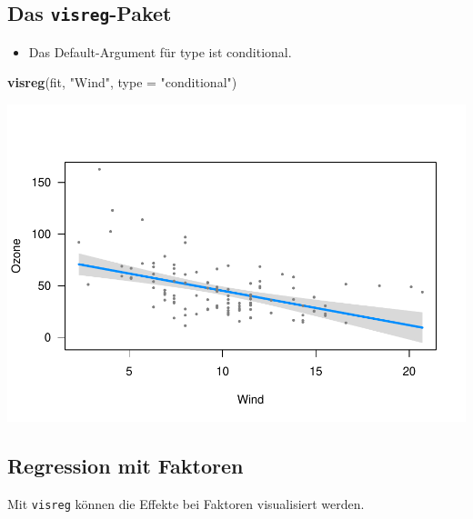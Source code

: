 \documentclass[]{article}
\newenvironment{Shaded}{\begin{snugshade}}{\end{snugshade}}
\newcommand{\KeywordTok}[1]{\textcolor[rgb]{0.13,0.29,0.53}{\textbf{{#1}}}}
\newcommand{\DataTypeTok}[1]{\textcolor[rgb]{0.13,0.29,0.53}{{#1}}}
\newcommand{\DecValTok}[1]{\textcolor[rgb]{0.00,0.00,0.81}{{#1}}}
\newcommand{\StringTok}[1]{\textcolor[rgb]{0.31,0.60,0.02}{{#1}}}
\newcommand{\NormalTok}[1]{{#1}}
\providecommand{\tightlist}{%
  \setlength{\itemsep}{0pt}\setlength{\parskip}{0pt}}
\begin{document}
\subsection{\texorpdfstring{Das
\texttt{visreg}-Paket}{Das visreg-Paket}}\label{das-visreg-paket-1}

\begin{itemize}
\tightlist
\item
  Das Default-Argument für type ist conditional.
\end{itemize}

\begin{Shaded}
\begin{Highlighting}[]
\KeywordTok{visreg}\NormalTok{(fit, }\StringTok{"Wind"}\NormalTok{, }\DataTypeTok{type =} \StringTok{"conditional"}\NormalTok{)}
\end{Highlighting}
\end{Shaded}

\includegraphics{Intro_Datenanalyse1_files/figure-latex/unnamed-chunk-281-1.pdf}

\subsection{Regression mit Faktoren}\label{regression-mit-faktoren}

Mit \texttt{visreg} können die Effekte bei Faktoren visualisiert werden.

\begin{Shaded}
\end{Shaded}
\end{document}
